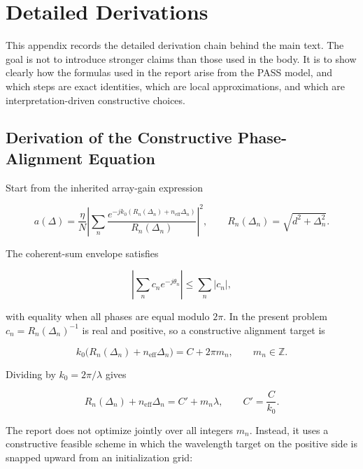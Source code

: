 \section{Detailed Derivations}

This appendix records the detailed derivation chain behind the main text. The goal is not to introduce stronger claims than those used in the body. It is to show clearly how the formulas used in the report arise from the PASS model, and which steps are exact identities, which are local approximations, and which are interpretation-driven constructive choices.

\subsection{Derivation of the Constructive Phase-Alignment Equation}

Start from the inherited array-gain expression

\begin{equation}
a(\Delta)
= \frac{\eta}{N}
\left|
\sum_n \frac{e^{-j k_0 (R_n(\Delta_n) + n_{\mathrm{eff}}\Delta_n)}}{R_n(\Delta_n)}
\right|^2,
\qquad
R_n(\Delta_n)=\sqrt{d^2+\Delta_n^2}.
\label{eq:app_array_gain}
\end{equation}

The coherent-sum envelope satisfies

\begin{equation}
\left|\sum_n c_n e^{-j\theta_n}\right|
\le \sum_n |c_n|,
\label{eq:app_triangle}
\end{equation}

with equality when all phases are equal modulo $2\pi$. In the present problem $c_n = R_n(\Delta_n)^{-1}$ is real and positive, so a constructive alignment target is

\begin{equation}
k_0 \big(R_n(\Delta_n)+n_{\mathrm{eff}}\Delta_n\big)
= C + 2\pi m_n,
\qquad m_n \in \mathbb{Z}.
\label{eq:app_alignment}
\end{equation}

Dividing by $k_0 = 2\pi/\lambda$ gives

\begin{equation}
R_n(\Delta_n)+n_{\mathrm{eff}}\Delta_n
= C' + m_n \lambda,
\qquad
C'=\frac{C}{k_0}.
\label{eq:app_alignment_lambda}
\end{equation}

The report does not optimize jointly over all integers $m_n$. Instead, it uses a constructive feasible scheme in which the wavelength target on the positive side is snapped upward from an initialization grid:

